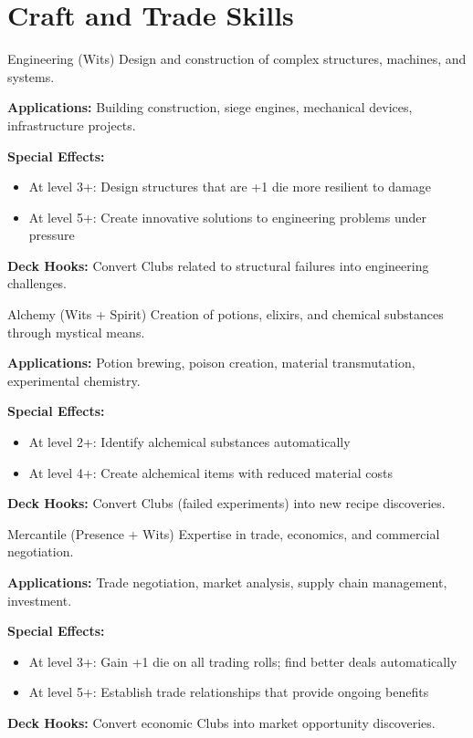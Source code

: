 \section{Craft and Trade Skills}

\begin{skillbox}{Engineering (Wits)}
Design and construction of complex structures, machines, and systems.

\textbf{Applications:} Building construction, siege engines, mechanical devices, infrastructure projects.

\textbf{Special Effects:}
\begin{itemize}
    \item At level 3+: Design structures that are +1 die more resilient to damage
    \item At level 5+: Create innovative solutions to engineering problems under pressure
\end{itemize}

\textbf{Deck Hooks:} Convert Clubs related to structural failures into engineering challenges.
\end{skillbox}

\begin{skillbox}{Alchemy (Wits + Spirit)}
Creation of potions, elixirs, and chemical substances through mystical means.

\textbf{Applications:} Potion brewing, poison creation, material transmutation, experimental chemistry.

\textbf{Special Effects:}
\begin{itemize}
    \item At level 2+: Identify alchemical substances automatically
    \item At level 4+: Create alchemical items with reduced material costs
\end{itemize}

\textbf{Deck Hooks:} Convert Clubs (failed experiments) into new recipe discoveries.
\end{skillbox}

\begin{skillbox}{Mercantile (Presence + Wits)}
Expertise in trade, economics, and commercial negotiation.

\textbf{Applications:} Trade negotiation, market analysis, supply chain management, investment.

\textbf{Special Effects:}
\begin{itemize}
    \item At level 3+: Gain +1 die on all trading rolls; find better deals automatically
    \item At level 5+: Establish trade relationships that provide ongoing benefits
\end{itemize}

\textbf{Deck Hooks:} Convert economic Clubs into market opportunity discoveries.
\end{skillbox}


